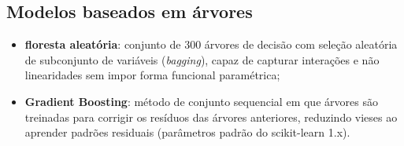 \subsection{Modelos baseados em árvores}

\begin{itemize}
    \item \textbf{floresta aleatória}: conjunto de 300 árvores de decisão com seleção
    aleatória de subconjunto de variáveis (\textit{bagging}), capaz de capturar
    interações e não linearidades sem impor forma funcional paramétrica;
    \item \textbf{Gradient Boosting}: método de conjunto sequencial em que árvores
    são treinadas para corrigir os resíduos das árvores anteriores, reduzindo vieses
    ao aprender padrões residuais (parâmetros padrão do scikit-learn 1.x).
\end{itemize}

